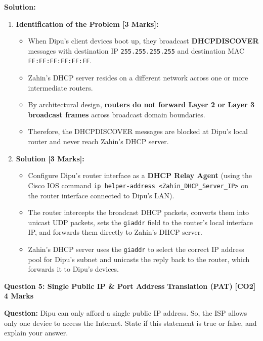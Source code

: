 \documentclass[11pt,a4paper]{article}
\newcommand{\questionheader}[3]{
    \vspace{0.35cm}
    \noindent\colorbox{qboxbg}{
        \parbox{\dimexpr\textwidth-2\fboxsep\relax}{
            \textbf{\textcolor{primary}{\large #1}} \hfill \textbf{\textcolor{accent}{[#2]}} \hfill \textbf{\textcolor{secondary}{#3 Marks}}
        }
    }
    \vspace{0.15cm}
}
\begin{document}
\textbf{Solution:}
\begin{enumerate}
    \item \textbf{Identification of the Problem [3 Marks]:}
    \begin{itemize}
        \item When Dipu's client devices boot up, they broadcast \textbf{DHCPDISCOVER} messages with destination IP \texttt{255.255.255.255} and destination MAC \texttt{FF:FF:FF:FF:FF:FF}.
        \item Zahin's DHCP server resides on a different network across one or more intermediate routers.
        \item By architectural design, \textbf{routers do not forward Layer 2 or Layer 3 broadcast frames} across broadcast domain boundaries.
        \item Therefore, the DHCPDISCOVER messages are blocked at Dipu's local router and never reach Zahin's DHCP server.
    \end{itemize}
    \item \textbf{Solution [3 Marks]:}
    \begin{itemize}
        \item Configure Dipu's router interface as a \textbf{DHCP Relay Agent} (using the Cisco IOS command \texttt{ip helper-address <Zahin\_DHCP\_Server\_IP>} on the router interface connected to Dipu's LAN).
        \item The router intercepts the broadcast DHCP packets, converts them into unicast UDP packets, sets the \texttt{giaddr} field to the router's local interface IP, and forwards them directly to Zahin's DHCP server.
        \item Zahin's DHCP server uses the \texttt{giaddr} to select the correct IP address pool for Dipu's subnet and unicasts the reply back to the router, which forwards it to Dipu's devices.
    \end{itemize}
\end{enumerate}

\questionheader{Question 5: Single Public IP \& Port Address Translation (PAT)}{CO2}{4}

\textbf{Question:} Dipu can only afford a single public IP address. So, the ISP allows only one device to access the Internet. State if this statement is true or false, and explain your answer.
\end{document}
